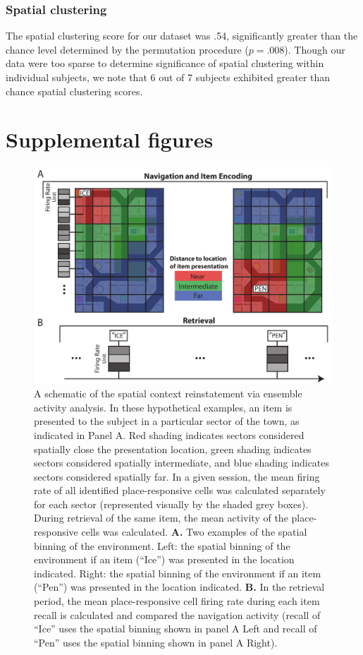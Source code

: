 \subsubsection*{Spatial clustering}
The spatial clustering score for our dataset was .54, significantly greater than the chance level determined by the permutation procedure ($p = .008$).  Though our data were too sparse to determine significance of spatial clustering within individual subjects, we note that 6 out of 7 subjects exhibited greater than chance spatial clustering scores.

\clearpage
\section{Supplemental figures}

 \begin{figure}[ht]
\centering
  \includegraphics[width=.95\textwidth]{./tex/dboy/figs/methods}
  \caption[Spatial context reinstatement analysis method]{A schematic of the spatial context reinstatement via ensemble activity analysis. In these hypothetical examples, an item is presented to the subject in a particular sector of the town, as indicated in Panel A.  Red shading indicates sectors considered spatially close the presentation location, green shading indicates sectors considered spatially intermediate, and blue shading indicates sectors considered spatially far. In a given session, the mean firing rate of all identified place-responsive cells was calculated separately for each sector (represented visually by the shaded grey boxes).  During retrieval of the same item, the mean activity of the place-responsive cells was calculated.  \textbf{A.} Two examples of the spatial binning of the environment. Left: the spatial binning of the environment if an item (``Ice'') was presented in the location indicated. Right: the spatial binning of the environment if an item (``Pen'') was presented in the location indicated.  \textbf{B.} In the retrieval period, the mean place-responsive cell firing rate during each item recall is calculated and compared the navigation activity (recall of ``Ice'' uses the spatial binning shown in panel A Left and recall of ``Pen'' uses the spatial binning shown in panel A Right).}
\label{fig:methods}
\end{figure}

